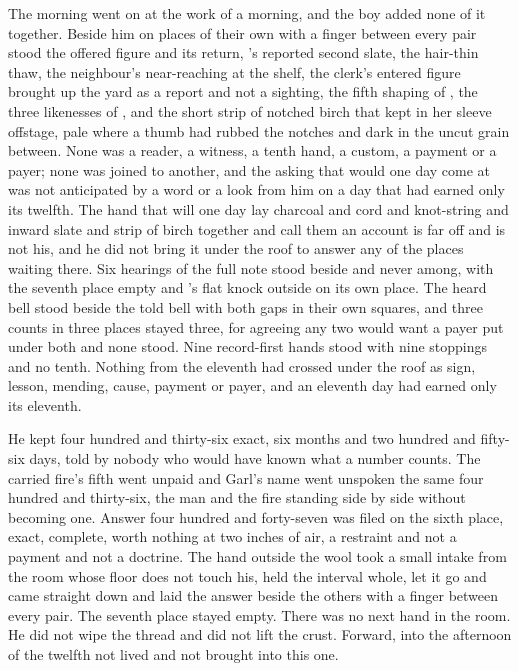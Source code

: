 The morning went on at the work of a morning, and the boy added none of it together. Beside him on places of their own with a finger between every pair stood the offered figure and its return, 's reported second slate, the hair-thin thaw, the neighbour's near-reaching at the shelf, the clerk's entered figure brought up the yard as a report and not a sighting, the fifth shaping of , the three likenesses of , and the short strip of notched birch that  kept in her sleeve offstage, pale where a thumb had rubbed the notches and dark in the uncut grain between. None was a reader, a witness, a tenth hand, a custom, a payment or a payer; none was joined to another, and the asking that would one day come at  was not anticipated by a word or a look from him on a day that had earned only its twelfth. The hand that will one day lay charcoal and cord and knot-string and inward slate and strip of birch together and call them an account is far off and is not his, and he did not bring it under the roof to answer any of the places waiting there. Six hearings of the full note stood beside and never among, with the seventh place empty and 's flat knock outside on its own place. The heard bell stood beside the told bell with both gaps in their own squares, and three counts in three places stayed three, for agreeing any two would want a payer put under both and none stood. Nine record-first hands stood with nine stoppings and no tenth. Nothing from the eleventh had crossed under the roof as sign, lesson, mending, cause, payment or payer, and an eleventh day had earned only its eleventh.

He kept four hundred and thirty-six exact, six months and two hundred and fifty-six days, told by nobody who would have known what a number counts. The carried fire's fifth went unpaid and Garl's name went unspoken the same four hundred and thirty-six, the man and the fire standing side by side without becoming one. Answer four hundred and forty-seven was filed on the sixth place, exact, complete, worth nothing at two inches of air, a restraint and not a payment and not a doctrine. The hand outside the wool took a small intake from the room whose floor does not touch his, held the interval whole, let it go and came straight down and laid the answer beside the others with a finger between every pair. The seventh place stayed empty. There was no next hand in the room. He did not wipe the thread and did not lift the crust. Forward, into the afternoon of the twelfth not lived and not brought into this one.
